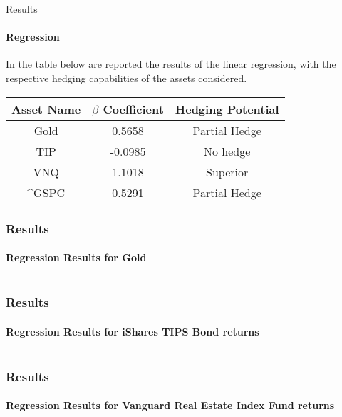 \documentclass{beamer}
\begin{document}
\begin{frame}[fragile]{Results}
\framesubtitle{Regression}

In the table below are reported the results of the linear regression, with the respective hedging capabilities of the assets considered.

\begin{table}[h!]
  \centering
  \begin{tabular}{|c|c|c|}
    \hline
    \textbf{Asset Name} & \textbf{$\beta$ Coefficient} & \textbf{Hedging Potential} \\
    \hline
    Gold & 0.5658 & Partial Hedge \\ \hline
    TIP & -0.0985 & No hedge \\ \hline
    VNQ & 1.1018 & Superior \\ \hline
    \textasciicircum GSPC & 0.5291 & Partial Hedge \\  \hline
  \end{tabular}
  
  \label{tab:table1}
\end{table}

\end{frame}


\begin{frame}
  \frametitle{Results}
  \framesubtitle{Regression Results for Gold}
  \vspace{-7.5pt}
  \begin{center}
    \begin{tabular}{c}
     
    \end{tabular}
  \end{center}
\end{frame}

\begin{frame}
  \frametitle{Results}
  \framesubtitle{Regression Results for iShares TIPS Bond returns}
    \vspace{-7.5pt}
  \begin{center}
    \begin{tabular}{c}
     
    \end{tabular}
  \end{center}
\end{frame}

\begin{frame}
  \frametitle{Results}
  \framesubtitle{Regression Results for Vanguard Real Estate Index Fund returns}
    \vspace{-7.5pt}
  \begin{center}
    \begin{tabular}{c}
     
    \end{tabular}
  \end{center}
\end{frame}
\end{document}
